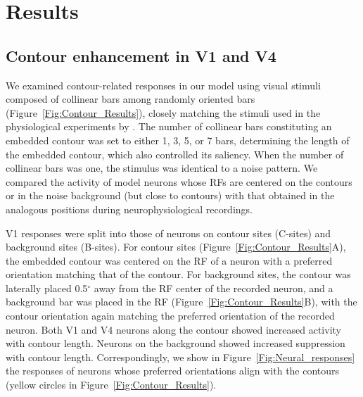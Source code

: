 \section{Results}
\label{sec:results}

\subsection{Contour enhancement in V1 and V4}
\label{sec:contour}
We examined contour-related responses in our model using visual stimuli composed of collinear bars among randomly oriented bars (Figure~\ref{Fig:Contour_Results}), closely matching the stimuli used
in the physiological experiments by \cite{Chen_etal14}. The number of
collinear bars constituting an embedded contour was set to either 1, 3, 5, or 7 bars, determining the length of the embedded contour, which also controlled its saliency.  When the number of collinear bars was one, the stimulus was identical to a noise pattern. We compared the
activity of model neurons whose RFs are centered on the contours or in
the noise background (but close to contours) with that obtained in the
analogous positions during neurophysiological recordings.

V1 responses were split into those of neurons on contour sites (C-sites) and background sites (B-sites). For contour sites (Figure~\ref{Fig:Contour_Results}A), the embedded contour was centered
on the RF of a neuron with a preferred orientation matching that of
the contour. For background sites, the contour was laterally placed
0.5$^{\circ}$ away from the RF center of the recorded neuron, and a
background bar was placed in the RF (Figure~\ref{Fig:Contour_Results}B), with the contour orientation again matching the preferred orientation of the recorded neuron. Both V1 and V4 neurons along the contour showed increased activity with contour length. Neurons on the background showed increased suppression with contour length. Correspondingly, we show in Figure~\ref{Fig:Neural_responses} the responses of neurons whose preferred orientations align with the contours (yellow circles in Figure~\ref{Fig:Contour_Results}).

